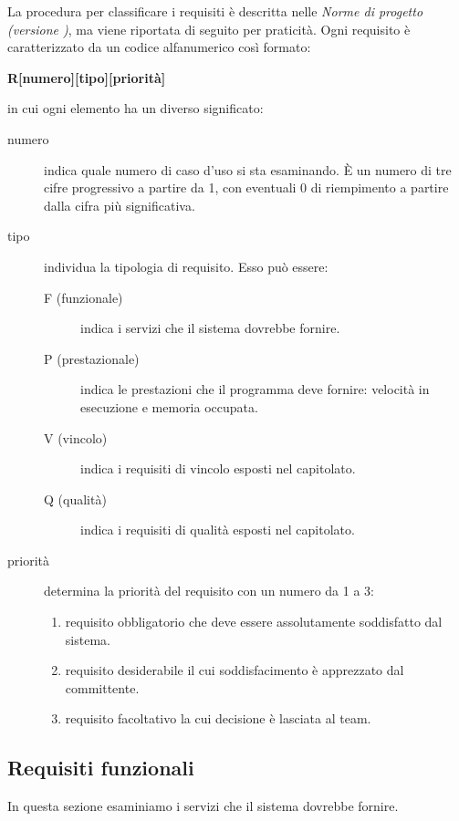 \documentclass[../analisi-dei-requisiti.tex]{subfiles}
\begin{document}
La procedura per classificare i requisiti è descritta nelle \textit{Norme di progetto (versione \versione)}, ma viene riportata di seguito per praticità.
Ogni requisito è caratterizzato da un codice alfanumerico così formato:
\begin{center}
  \textbf{R[numero][tipo][priorità]}
\end{center}
in cui ogni elemento ha un diverso significato:
\begin{description}
  \item [numero] indica quale numero di caso d'uso si sta esaminando. È un numero di tre cifre progressivo a partire da 1, con eventuali 0 di riempimento a partire dalla cifra più significativa.
  \item [tipo] individua la tipologia di requisito. Esso può essere:
        \begin{description}
          \item [F (funzionale)] indica i servizi che il sistema dovrebbe fornire.
          \item [P (prestazionale)] indica le prestazioni che il programma deve fornire: velocità in esecuzione e memoria occupata.
          \item [V (vincolo)] indica i requisiti di vincolo esposti nel capitolato.
          \item [Q (qualità)] indica i requisiti di qualità esposti nel capitolato.
        \end{description}
  \item [priorità] determina la priorità del requisito con un numero da 1 a 3:
        \begin{enumerate}
          \item requisito obbligatorio che deve essere assolutamente soddisfatto dal sistema.
          \item requisito desiderabile il cui soddisfacimento è apprezzato dal committente.
          \item requisito facoltativo la cui decisione è lasciata al team.
        \end{enumerate}
\end{description}

\subsection{Requisiti funzionali}%
\label{sub:requisiti_funzionali}
In questa sezione esaminiamo i servizi che il sistema dovrebbe fornire.
\end{document}
